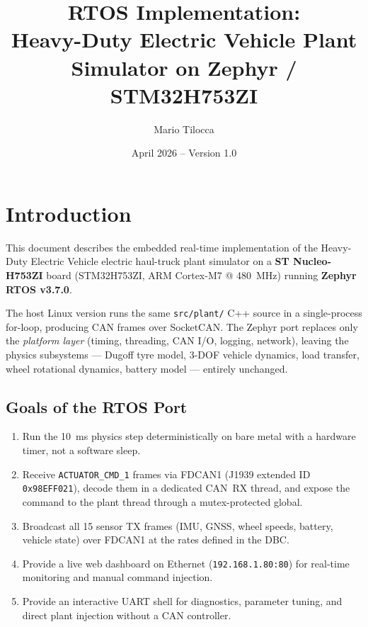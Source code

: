 \documentclass[11pt,a4paper]{article}
\title{RTOS Implementation:\\
Heavy-Duty Electric Vehicle Plant Simulator on Zephyr / STM32H753ZI}
\author{Mario Tilocca}
\date{April 2026 -- Version 1.0}
\begin{document}
\maketitle
\tableofcontents
\newpage

\section{Introduction}

This document describes the embedded real-time implementation of the Heavy-Duty Electric Vehicle
electric haul-truck plant simulator on a \textbf{ST Nucleo-H753ZI} board
(STM32H753ZI, ARM Cortex-M7 @ \SI{480}{MHz}) running \textbf{Zephyr RTOS v3.7.0}.

The host Linux version runs the same \texttt{src/plant/} C++ source in a
single-process for-loop, producing CAN frames over SocketCAN. The Zephyr port
replaces only the \emph{platform layer} (timing, threading, CAN I/O, logging,
network), leaving the physics subsystems — Dugoff tyre model, 3-DOF vehicle
dynamics, load transfer, wheel rotational dynamics, battery model — entirely
unchanged.

\subsection{Goals of the RTOS Port}

\begin{enumerate}[leftmargin=*]
  \item Run the \SI{10}{ms} physics step deterministically on bare metal with
        a hardware timer, not a software sleep.
  \item Receive \texttt{ACTUATOR\_CMD\_1} frames via FDCAN1 (J1939 extended ID
        \texttt{0x98EFF021}), decode them in a dedicated CAN~RX thread, and
        expose the command to the plant thread through a mutex-protected global.
  \item Broadcast all 15 sensor TX frames (IMU, GNSS, wheel speeds, battery,
        vehicle state) over FDCAN1 at the rates defined in the DBC.
  \item Provide a live web dashboard on Ethernet (\texttt{192.168.1.80:80})
        for real-time monitoring and manual command injection.
  \item Provide an interactive UART shell for diagnostics, parameter tuning,
        and direct plant injection without a CAN controller.
\end{enumerate}
\end{document}
